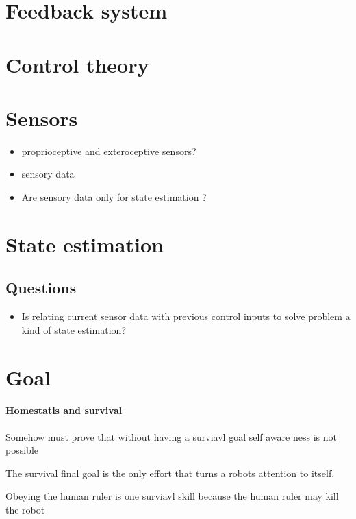 \section{Feedback system}

\section{Control theory}

\section{Sensors}
    \begin{itemize}
        \item proprioceptive and exteroceptive sensors?
        \item sensory data
        \item Are sensory data only for state estimation ?
    \end{itemize}

\section{State estimation}
    \subsection{Questions}
        \begin{itemize}
            \item Is relating current sensor data with previous control inputs to solve problem a kind of state estimation?
        \end{itemize}
    
\section{Goal}
    \paragraph{Homestatis and survival}
        Somehow must prove that without having a surviavl goal self aware ness is not possible
        
        The survival final goal is the only effort that turns a robots attention to itself.
        
        Obeying the human ruler is one surviavl skill because the human ruler may kill the robot


